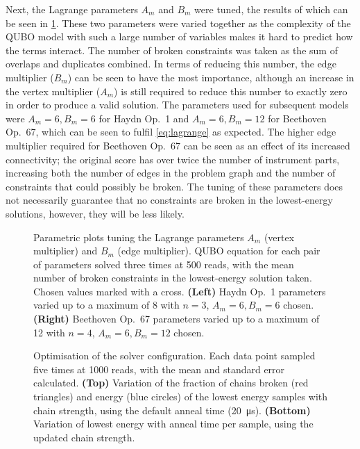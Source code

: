 \documentclass[12pt]{article}
\theoremstyle{definition}
\begin{document}
Next, the Lagrange parameters $A_m$ and $B_m$ were tuned, the results of which can be seen in \cref{fig:lagrange}. These two parameters were varied together as the complexity of the QUBO model with such a large number of variables makes it hard to predict how the terms interact.
The number of broken constraints was taken as the sum of overlaps and duplicates combined. In terms of reducing this number, the edge multiplier ($B_m$) can be seen to have the most importance, although an increase in the vertex multiplier ($A_m$) is still required to reduce this number to exactly zero in order to produce a valid solution. The parameters used for subsequent models were $A_m=6,B_m=6$ for Haydn Op.\ 1 and $A_m=6,B_m=12$ for Beethoven Op.\ 67, which can be seen to fulfil \cref{eq:lagrange} as expected. The higher edge multiplier required for Beethoven Op.\ 67 can be seen as an effect of its increased connectivity; the original score has over twice the number of instrument parts, increasing both the number of edges in the problem graph and the number of constraints that could possibly be broken. The tuning of these parameters does not necessarily guarantee that no constraints are broken in the lowest-energy solutions, however, they will be less likely.

\begin{figure}[p]
    \centering\footnotesize
    
    \caption{Parametric plots tuning the Lagrange parameters $A_m$ (vertex multiplier) and $B_m$ (edge multiplier). QUBO equation for each pair of parameters solved three times at \num{500} reads, with the mean number of broken constraints in the lowest-energy solution taken. Chosen values marked with a cross. \textbf{(Left)} Haydn Op.\ 1 parameters varied up to a maximum of \num{8} with $n=3$, $A_m=6,B_m=6$ chosen. \textbf{(Right)} Beethoven Op.\ 67 parameters varied up to a maximum of \num{12} with $n=4$, $A_m=6,B_m=12$ chosen.}
    \label{fig:lagrange}
\end{figure}

\begin{figure}[p]
    \centering\footnotesize
    
    \caption{Optimisation of the solver configuration. Each data point sampled five times at \num{1000} reads, with the mean and standard error calculated. \textbf{(Top)} Variation of the fraction of chains broken (red triangles) and energy (blue circles) of the lowest energy samples with chain strength, using the default anneal time (\qty{20}{\us}).  \textbf{(Bottom)} Variation of lowest energy with anneal time per sample, using the updated chain strength.}
    \label{fig:solver-configuration}
\end{figure}
\end{document}
